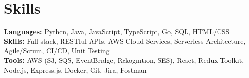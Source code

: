 \documentclass[11pt]{article}       %
\begin{document}

\vspace{-18.5pt}

\section*{Skills}
\textbf{Languages:} Python, Java, JavaScript, TypeScript, Go, SQL, HTML/CSS\\
\textbf{Skills:} Full-stack, RESTful APIs, AWS Cloud Services, Serverless Architecture, Agile/Scrum, CI/CD, Unit Testing\\
\textbf{Tools:} AWS (S3, SQS, EventBridge, Rekognition, SES), React, Redux Toolkit, Node.js, Express.js, Docker, Git, Jira, Postman\\

\vspace{-6.5pt}
\end{document}
